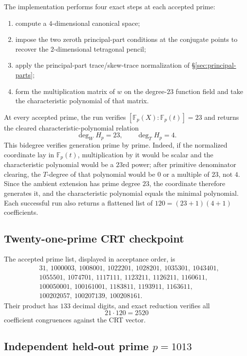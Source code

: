 \documentclass[11pt]{article}
\newcommand{\F}{\mathbb F}
\begin{document}
The implementation performs four exact steps at each accepted prime:
\begin{enumerate}
\item compute a $4$-dimensional canonical space;
\item impose the two zeroth principal-part conditions at the conjugate points to recover the $2$-dimensional tetragonal pencil;
\item apply the principal-part trace/skew-trace normalization of \S\ref{sec:principal-parts};
\item form the multiplication matrix of $w$ on the degree-$23$ function field and take the characteristic polynomial of that matrix.
\end{enumerate}

At every accepted prime, the run verifies $[\F_p(X):\F_p(t)]=23$ and returns the cleared characteristic-polynomial relation
\[
 \deg_W H_p=23,
 \qquad
 \deg_T H_p=4.
\]
This bidegree verifies generation prime by prime.  Indeed, if the normalized coordinate lay in $\F_p(t)$, multiplication by it would be scalar and the characteristic polynomial would be a $23$rd power; after primitive denominator clearing, the $T$-degree of that polynomial would be $0$ or a multiple of $23$, not $4$.  Since the ambient extension has prime degree $23$, the coordinate therefore generates it, and the characteristic polynomial equals the minimal polynomial.  Each successful run also returns a flattened list of $120=(23+1)(4+1)$ coefficients.

\subsection{Twenty-one-prime CRT checkpoint}

The accepted prime list, displayed in acceptance order, is
\[
\begin{aligned}
&31,\ 1000003,\ 1008001,\ 1022201,\ 1028201,\ 1035301,\ 1043401,\\
&1055501,\ 1074701,\ 1117111,\ 1123211,\ 1126211,\ 1160611,\\
&100050001,\ 100161001,\ 1183811,\ 1193911,\ 1163611,\\
&100202057,\ 100207139,\ 100208161.
\end{aligned}
\]
Their product has $133$ decimal digits, and exact reduction verifies all
\[
 21\cdot120=2520
\]
coefficient congruences against the CRT vector.

\subsection{Independent held-out prime \texorpdfstring{$p=1013$}{p=1013}}
\end{document}
